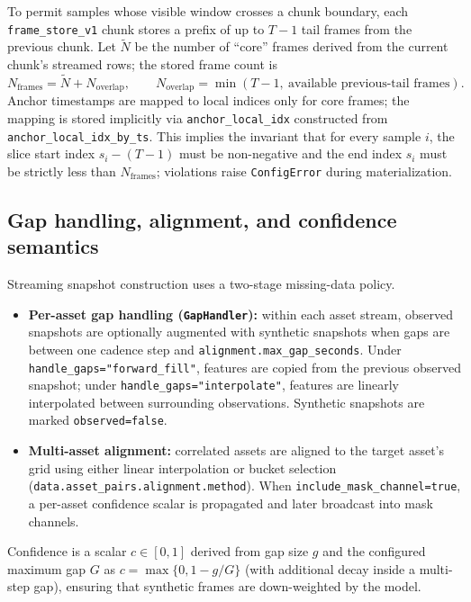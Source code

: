 \documentclass[11pt]{article}
\begin{document}
To permit samples whose visible window crosses a chunk boundary, each \texttt{frame\_store\_v1} chunk stores a prefix of up to $T-1$ tail frames from the previous chunk. Let $\tilde{N}$ be the number of ``core'' frames derived from the current chunk's streamed rows; the stored frame count is
\begin{equation}
  N_{\mathrm{frames}} = \tilde{N} + N_{\mathrm{overlap}}, \qquad N_{\mathrm{overlap}} = \min(T-1,\ \text{available previous-tail frames}).
\end{equation}
Anchor timestamps are mapped to local indices only for core frames; the mapping is stored implicitly via \texttt{anchor\_local\_idx} constructed from \texttt{anchor\_local\_idx\_by\_ts}. This implies the invariant that for every sample $i$, the slice start index $s_i-(T-1)$ must be non-negative and the end index $s_i$ must be strictly less than $N_{\mathrm{frames}}$; violations raise \texttt{ConfigError} during materialization.

\subsection{Gap handling, alignment, and confidence semantics}

Streaming snapshot construction uses a two-stage missing-data policy.
\begin{itemize}
  \item \textbf{Per-asset gap handling (\texttt{GapHandler}):} within each asset stream, observed snapshots are optionally augmented with synthetic snapshots when gaps are between one cadence step and \texttt{alignment.max\_gap\_seconds}. Under \texttt{handle\_gaps="forward\_fill"}, features are copied from the previous observed snapshot; under \texttt{handle\_gaps="interpolate"}, features are linearly interpolated between surrounding observations. Synthetic snapshots are marked \texttt{observed=false}.
  \item \textbf{Multi-asset alignment:} correlated assets are aligned to the target asset's grid using either linear interpolation or bucket selection (\texttt{data.asset\_pairs.alignment.method}). When \texttt{include\_mask\_channel=true}, a per-asset confidence scalar is propagated and later broadcast into mask channels.
\end{itemize}

Confidence is a scalar $c\in[0,1]$ derived from gap size $g$ and the configured maximum gap $G$ as $c = \max\{0, 1 - g/G\}$ (with additional decay inside a multi-step gap), ensuring that synthetic frames are down-weighted by the model.
\end{document}
